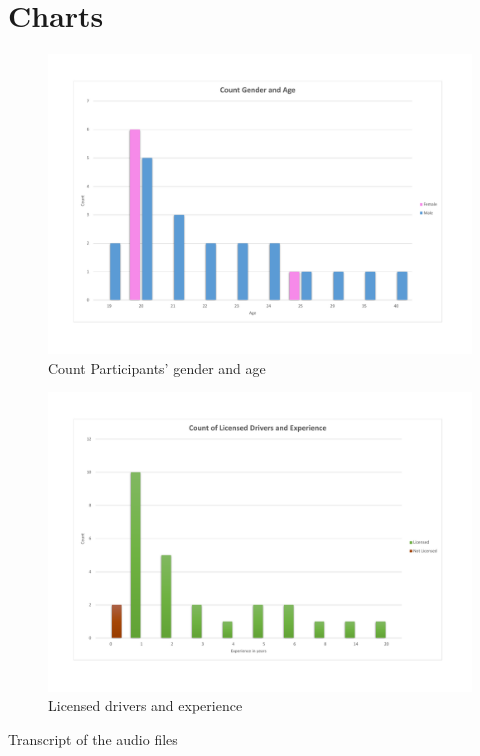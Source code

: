 \section{Charts}

\begin{figure}[!htb]
	\centering
	\includegraphics[width=\textwidth]{charts/genderAge.pdf}
	\caption[Sample age and gender]{Count Participants' gender and age }
	\label{fig:chart-genderage}
\end{figure}

\begin{figure}[!htb]
	\centering
	\includegraphics[width=\textwidth]{charts/licenseddriversexperience.pdf}
	\caption[Licensed drivers experience]{Licensed drivers and experience}
	\label{fig:chart-licenseddriversexperience}
\end{figure}

Transcript of the audio files